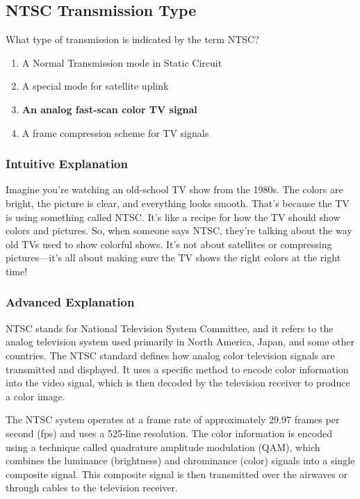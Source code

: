 \subsection{NTSC Transmission Type}
\label{T8D04}

\begin{tcolorbox}[colback=gray!10!white,colframe=black!75!black,title=T8D04]
What type of transmission is indicated by the term NTSC?  
\begin{enumerate}[label=\Alph*)]
    \item A Normal Transmission mode in Static Circuit
    \item A special mode for satellite uplink
    \item \textbf{An analog fast-scan color TV signal}
    \item A frame compression scheme for TV signals
\end{enumerate}
\end{tcolorbox}

\subsubsection{Intuitive Explanation}
Imagine you’re watching an old-school TV show from the 1980s. The colors are bright, the picture is clear, and everything looks smooth. That’s because the TV is using something called NTSC. It’s like a recipe for how the TV should show colors and pictures. So, when someone says NTSC, they’re talking about the way old TVs used to show colorful shows. It’s not about satellites or compressing pictures—it’s all about making sure the TV shows the right colors at the right time!

\subsubsection{Advanced Explanation}
NTSC stands for National Television System Committee, and it refers to the analog television system used primarily in North America, Japan, and some other countries. The NTSC standard defines how analog color television signals are transmitted and displayed. It uses a specific method to encode color information into the video signal, which is then decoded by the television receiver to produce a color image.

The NTSC system operates at a frame rate of approximately 29.97 frames per second (fps) and uses a 525-line resolution. The color information is encoded using a technique called quadrature amplitude modulation (QAM), which combines the luminance (brightness) and chrominance (color) signals into a single composite signal. This composite signal is then transmitted over the airwaves or through cables to the television receiver.

